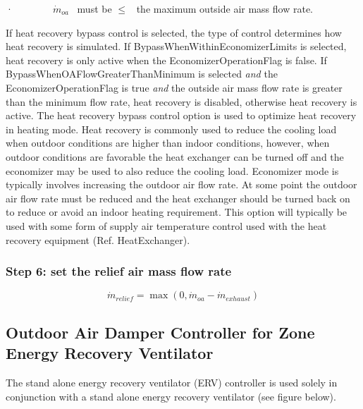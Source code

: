 ·~~~~~~~~\({\dot m_{oa}}\) ~must be \(\le\) ~the maximum outside air mass flow rate.

If heat recovery bypass control is selected, the type of control determines how heat recovery is simulated. If BypassWhenWithinEconomizerLimits is selected, heat recovery is only active when the EconomizerOperationFlag is false. If BypassWhenOAFlowGreaterThanMinimum is selected \emph{and} the EconomizerOperationFlag is true \emph{and} the outside air mass flow rate is greater than the minimum flow rate, heat recovery is disabled, otherwise heat recovery is active. The heat recovery bypass control option is used to optimize heat recovery in heating mode. Heat recovery is commonly used to reduce the cooling load when outdoor conditions are higher than indoor conditions, however, when outdoor conditions are favorable the heat exchanger can be turned off and the economizer may be used to also reduce the cooling load. Economizer mode is typically involves increasing the outdoor air flow rate. At some point the outdoor air flow rate must be reduced and the heat exchanger should be turned back on to reduce or avoid an indoor heating requirement. This option will typically be used with some form of supply air temperature control used with the heat recovery equipment (Ref. HeatExchanger).

\subsubsection{Step 6: set the relief air mass flow rate}\label{step-6-set-the-relief-air-mass-flow-rate}

\begin{equation}
{\dot m_{relief}} = \max (0,{\dot m_{oa}} - {\dot m_{exhaust}})
\end{equation}

\subsection{Outdoor Air Damper Controller for Zone Energy Recovery Ventilator}\label{outdoor-air-damper-controller-for-zone-energy-recovery-ventilator}

The stand alone energy recovery ventilator (ERV) controller is used solely in conjunction with a stand alone energy recovery ventilator (see figure below).


